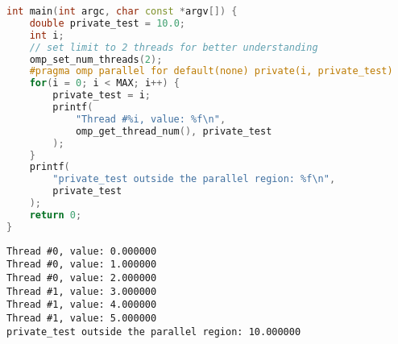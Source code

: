 \begin{itemize}
\begin{examplebox}
\begin{lstlisting}[language=C++]
int main(int argc, char const *argv[]) {
    double private_test = 10.0;
    int i;
    // set limit to 2 threads for better understanding
    omp_set_num_threads(2);
    #pragma omp parallel for default(none) private(i, private_test)
    for(i = 0; i < MAX; i++) {
        private_test = i;
        printf(
            "Thread #%i, value: %f\n", 
            omp_get_thread_num(), private_test
        );
    }
    printf(
        "private_test outside the parallel region: %f\n", 
        private_test
    );
    return 0;
}\end{lstlisting}

    \begin{lstlisting}[mathescape=false]
Thread #0, value: 0.000000
Thread #0, value: 1.000000
Thread #0, value: 2.000000
Thread #1, value: 3.000000
Thread #1, value: 4.000000
Thread #1, value: 5.000000
private_test outside the parallel region: 10.000000\end{lstlisting}
    \end{examplebox}
\end{itemize}